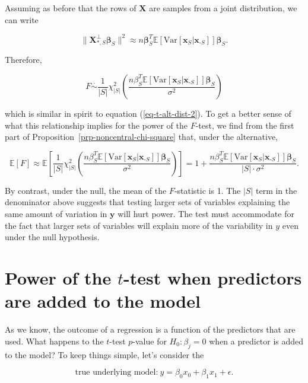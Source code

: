 \documentclass[
  11pt,
  letterpaper,
  oneside]{book}
\theoremstyle{definition}
\theoremstyle{plain}
\theoremstyle{plain}
\theoremstyle{plain}
\theoremstyle{remark}
\begin{document}
Assuming as before that the rows of \(\boldsymbol{X}\) are samples from
a joint distribution, we can write

\[
\|\boldsymbol{X}^\perp_{*, S}\boldsymbol{\beta}_S\|^2 \approx n\boldsymbol{\beta}_S^T \mathbb{E}[\text{Var}[\boldsymbol{x}_S|\boldsymbol{x}_{\text{-}S}]] \boldsymbol{\beta}_S.
\]

Therefore,

\[
F \overset{\cdot}{\sim} \frac{1}{|S|}\chi^2_{|S|}\left(\frac{n\beta_S^T \mathbb{E}[\text{Var}[\boldsymbol{x}_S|\boldsymbol{x}_{\text{-}S}]] \boldsymbol{\beta}_S}{\sigma^2}\right)
\]

which is similar in spirit to equation (\ref{eq-t-alt-dist-2}). To get a
better sense of what this relationship implies for the power of the
\(F\)-test, we find from the first part of
Proposition~\ref{prp-noncentral-chi-square} that, under the alternative,

\[
\mathbb{E}[F] \approx \mathbb{E}\left[\frac{1}{|S|}\chi^2_{|S|}\left(\frac{n\beta_S^T \mathbb{E}[\text{Var}[\boldsymbol{x}_S|\boldsymbol{x}_{\text{-}S}]] \boldsymbol{\beta}_S}{\sigma^2}\right)\right] = 1 + \frac{n\beta_S^T \mathbb{E}[\text{Var}[\boldsymbol{x}_S|\boldsymbol{x}_{\text{-}S}]] \boldsymbol{\beta}_S}{|S| \cdot \sigma^2}.
\]

By contrast, under the null, the mean of the \(F\)-statistic is 1. The
\(|S|\) term in the denominator above suggests that testing larger sets
of variables explaining the same amount of variation in
\(\boldsymbol{y}\) will hurt power. The test must accommodate for the
fact that larger sets of variables will explain more of the variability
in \(y\) even under the null hypothesis.

\hypertarget{power-of-the-t-test-when-predictors-are-added-to-the-model}{%
\section{\texorpdfstring{Power of the \(t\)-test when predictors are
added to the
model}{Power of the t-test when predictors are added to the model}}\label{power-of-the-t-test-when-predictors-are-added-to-the-model}}

As we know, the outcome of a regression is a function of the predictors
that are used. What happens to the \(t\)-test \(p\)-value for
\(H_0: \beta_j = 0\) when a predictor is added to the model? To keep
things simple, let's consider the

\[
\text{true underlying model:}\ y = \beta_0 x_0 + \beta_1 x_1 + \epsilon.
\]
\end{document}
